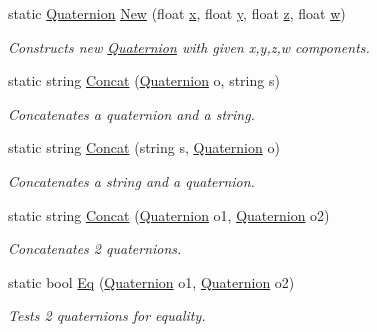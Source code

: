 \begin{DoxyCompactItemize}
\item 
static \mbox{\hyperlink{class_lua_1_1_quaternion}{Quaternion}} \mbox{\hyperlink{class_lua_1_1_quaternion_a39cfba79d11687138569de7edd9e2727}{New}} (float \mbox{\hyperlink{class_lua_1_1_quaternion_aefb405b7fafa79708a6d8120781debce}{x}}, float \mbox{\hyperlink{class_lua_1_1_quaternion_ab7eb002a81cfc537a9c3afc8965ef2ec}{y}}, float \mbox{\hyperlink{class_lua_1_1_quaternion_ac26c0a2710dd86783dee62c8645ee55c}{z}}, float \mbox{\hyperlink{class_lua_1_1_quaternion_a4a66f5c598907b4d906b0c5dd0e28526}{w}})
\begin{DoxyCompactList}\small\item\em Constructs new \mbox{\hyperlink{class_lua_1_1_quaternion}{Quaternion}} with given x,y,z,w components. \end{DoxyCompactList}\item 
static string \mbox{\hyperlink{class_lua_1_1_quaternion_ac70013482fc53c72c664561d67d5d677}{Concat}} (\mbox{\hyperlink{class_lua_1_1_quaternion}{Quaternion}} o, string s)
\begin{DoxyCompactList}\small\item\em Concatenates a quaternion and a string. \end{DoxyCompactList}\item 
static string \mbox{\hyperlink{class_lua_1_1_quaternion_a9eab1ab6fc89906ecc0b8159c1429a04}{Concat}} (string s, \mbox{\hyperlink{class_lua_1_1_quaternion}{Quaternion}} o)
\begin{DoxyCompactList}\small\item\em Concatenates a string and a quaternion. \end{DoxyCompactList}\item 
static string \mbox{\hyperlink{class_lua_1_1_quaternion_aef26c0eb5e338baa7dc1a87530b360d1}{Concat}} (\mbox{\hyperlink{class_lua_1_1_quaternion}{Quaternion}} o1, \mbox{\hyperlink{class_lua_1_1_quaternion}{Quaternion}} o2)
\begin{DoxyCompactList}\small\item\em Concatenates 2 quaternions. \end{DoxyCompactList}\item 
static bool \mbox{\hyperlink{class_lua_1_1_quaternion_a9ecf171f4a2a8c0ad3ced7564ada2c6d}{Eq}} (\mbox{\hyperlink{class_lua_1_1_quaternion}{Quaternion}} o1, \mbox{\hyperlink{class_lua_1_1_quaternion}{Quaternion}} o2)
\begin{DoxyCompactList}\small\item\em Tests 2 quaternions for equality. \end{DoxyCompactList}\item 

\end{DoxyCompactItemize}

